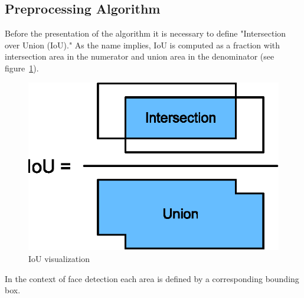 \subsection{Preprocessing Algorithm}\label{subsec:preproalgo}
Before the presentation of the algorithm it is necessary to define "Intersection over Union (IoU)."
As the name implies, IoU is computed as a fraction with intersection area in the numerator and union area in the
denominator (see figure~\ref{fig:iou}).
\begin{figure}[H]
    \centering
    \includegraphics{images/implementation/iou.eps}
    \caption{IoU visualization\cite{IoU}}
    \label{fig:iou}
\end{figure}
In the context of face detection each area is defined by a corresponding bounding box.

